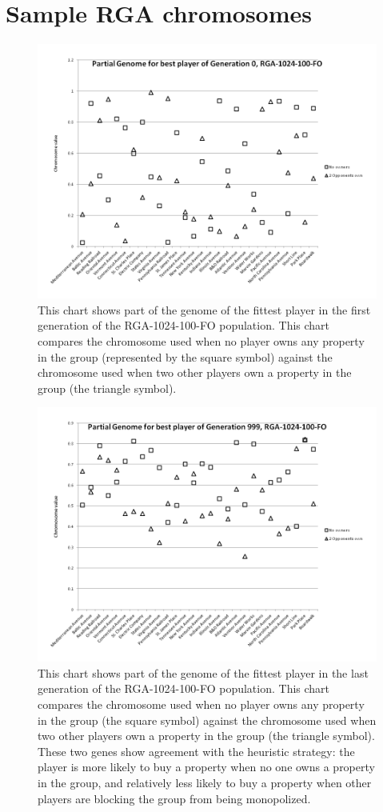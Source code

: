 \clearpage
\chapter{Sample RGA chromosomes}
\label{appendix:chromos}

\begin{figure}[htp]
\centerline{\includegraphics[width=0.75\columnwidth]{Figures/genome000.png}}
\caption[Illustration of Genome, Generation 0]{This chart shows part of the
genome of the fittest player in the first generation of the RGA-1024-100-FO
population. This chart compares the chromosome used when no player owns
any property in the group (represented by the square symbol) against the
chromosome used when two other players own a property in the group (the triangle
symbol).}
\label{app:figure-genome0}
\end{figure}

\begin{figure}[htp]
\centerline{\includegraphics[width=0.75\columnwidth]{Figures/genome999.png}}
\caption[Illustration of Genome, Generation 999]{This chart shows part of the
genome of the fittest player in the last generation of the RGA-1024-100-FO
population. This chart compares the chromosome used when no player owns any
property in the group (the square symbol) against the chromosome used when two
other players own a property in the group (the triangle symbol). These two genes
show agreement with the heuristic strategy: the player is more likely to buy a
property when no one owns a property in the group, and relatively less likely to
buy a property when other players are blocking the group from being
monopolized.}
\label{app:figure-genome999}
\end{figure}

